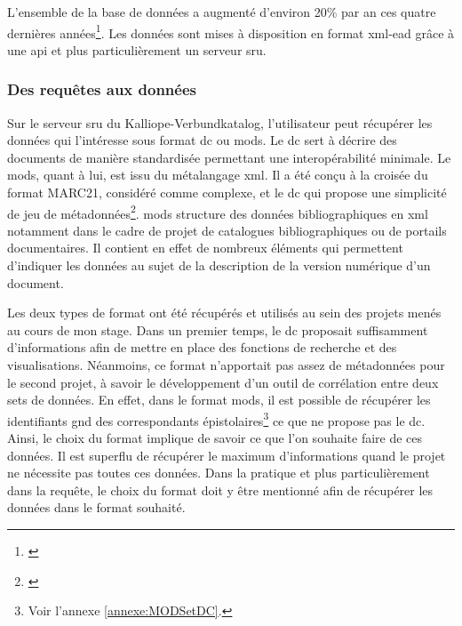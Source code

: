 \documentclass[a4paper, 12pt, twoside]{book}
\begin{document}
L'ensemble de la base de données a augmenté d'environ 20\% par an ces quatre dernières années\footnote{\cite{noauthor_kalliope_nodate}}. Les données sont mises à disposition en format \gls{xml}-\gls{ead} grâce à une \gls{api} et plus particulièrement un serveur \gls{sru}.

\subsubsection{Des requêtes aux données}
Sur le serveur \gls{sru} du Kalliope-Verbundkatalog, l'utilisateur peut récupérer les données qui l'intéresse sous format \gls{dc} ou \gls{mods}.
Le \gls{dc} sert à décrire des documents de manière standardisée permettant une interopérabilité minimale. Le \gls{mods}, quant à lui, est issu du métalangage \gls{xml}. Il a été conçu à la croisée du format MARC21, considéré comme complexe, et le \gls{dc} qui propose une simplicité de jeu de métadonnées\footnote{\cite{noauthor_metadata_2020}}. \gls{mods} structure des données bibliographiques en \gls{xml} notamment dans le cadre de projet de catalogues bibliographiques ou de portails documentaires. Il contient en effet de nombreux éléments qui permettent d'indiquer les données au sujet de la description de la version numérique d'un document. 

Les deux types de format ont été récupérés et utilisés au sein des projets menés au cours de mon stage. Dans un premier temps, le \gls{dc} proposait suffisamment d'informations afin de mettre en place des fonctions de recherche et des visualisations. Néanmoins, ce format n'apportait pas assez de métadonnées pour le second projet, à savoir le développement d'un outil de corrélation entre deux sets de données. En effet, dans le format \gls{mods}, il est possible de récupérer les identifiants \gls{gnd} des correspondants épistolaires\footnote{Voir l'annexe \ref{annexe:MODSetDC}.} ce que ne propose pas le \gls{dc}. Ainsi, le choix du format implique de savoir ce que l'on souhaite faire de ces données. Il est superflu de récupérer le maximum d'informations quand le projet ne nécessite pas toutes ces données. Dans la pratique et plus particulièrement dans la requête, le choix du format doit y être mentionné afin de récupérer les données dans le format souhaité.
\end{document}
